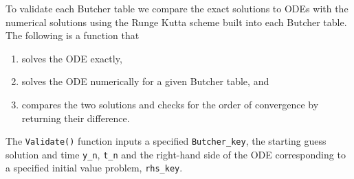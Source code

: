 \documentclass[landscape,letterpaper,10pt,english]{article}
\providecommand{\tightlist}{%
      \setlength{\itemsep}{0pt}\setlength{\parskip}{0pt}}
\begin{document}
\[\label{validfunc}\]

To validate each Butcher table we compare the exact solutions to ODEs
with the numerical solutions using the Runge Kutta scheme built into
each Butcher table. The following is a function that

\begin{enumerate}
\def\labelenumi{\arabic{enumi}.}
\tightlist
\item
  solves the ODE exactly,
\item
  solves the ODE numerically for a given Butcher table, and
\item
  compares the two solutions and checks for the order of convergence by
  returning their difference.
\end{enumerate}

The \texttt{Validate()} function inputs a specified
\texttt{Butcher\_key}, the starting guess solution and time
\texttt{y\_n}, \texttt{t\_n} and the right-hand side of the ODE
corresponding to a specified initial value problem, \texttt{rhs\_key}.
\end{document}
